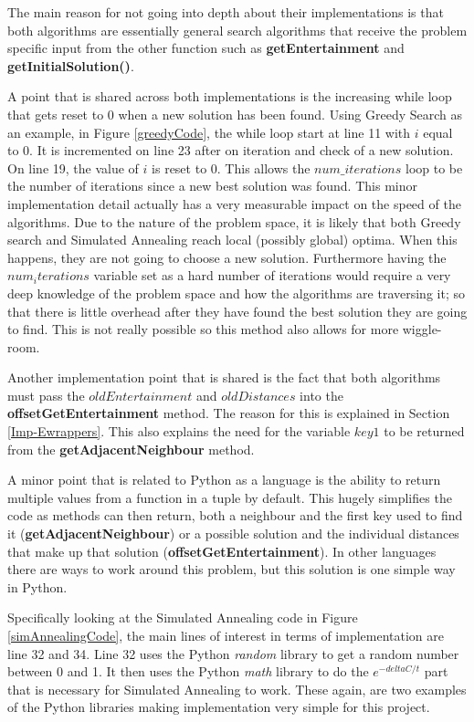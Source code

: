 \documentclass[12pt]{report}
\begin{document}
The main reason for not going into depth about their implementations is that both algorithms are essentially general search algorithms that receive the problem specific input from the other function such as \textbf{getEntertainment} and \textbf{getInitialSolution()}.

A point that is shared across both implementations is the increasing while loop that gets reset to 0 when a new solution has been found. Using Greedy Search as an example, in Figure \ref{greedyCode}, the while loop start at line 11 with $i$ equal to 0. It is incremented on line 23 after on iteration and check of a new solution. On line 19, the value of $i$ is reset to 0. This allows the $num\_iterations$ loop to be the number of iterations since a new best solution was found. This minor implementation detail actually has a very measurable impact on the speed of the algorithms. Due to the nature of the problem space, it is likely that both Greedy search and Simulated Annealing reach local (possibly global) optima. When this happens, they are not going to choose a new solution. Furthermore having the $num_iterations$ variable set as a hard number of iterations would require a very deep knowledge of the problem space and how the algorithms are traversing it; so that there is little overhead after they have found the best solution they are going to find. This is not really possible so this method also allows for more wiggle-room.

Another implementation point that is shared is the fact that both algorithms must pass the $oldEntertainment$ and $oldDistances$ into the \textbf{offsetGetEntertainment} method. The reason for this is explained in Section \ref{Imp-Ewrappers}. This also explains the need for the variable $key1$ to be returned from the \textbf{getAdjacentNeighbour} method. 

A minor point that is related to Python as a language is the ability to return multiple values from a function in a tuple by default. This hugely simplifies the code as methods can then return, both a neighbour and the first key used to find it (\textbf{getAdjacentNeighbour}) or a possible solution and the individual distances that make up that solution (\textbf{offsetGetEntertainment}). In other languages there are ways to work around this problem, but this solution is one simple way in Python.

Specifically looking at the Simulated Annealing code in Figure \ref{simAnnealingCode}, the main lines of interest in terms of implementation are line 32 and 34. Line 32 uses the Python \textit{random}\cite{PythonRandom} library to get a random number between 0 and 1. It then uses the Python \textit{math}\cite{PythonMath} library to do the $e^{-deltaC/t}$ part that is necessary for Simulated Annealing to work. These again, are two examples of the Python libraries making implementation very simple for this project.
\end{document}
